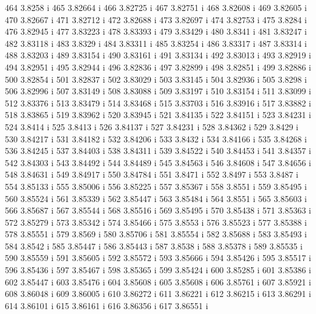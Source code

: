  464  3.8258  i
 465  3.82664  i
 466  3.82725  i
 467  3.82751  i
 468  3.82608  i
 469  3.82605  i
 470  3.82667  i
 471  3.82712  i
 472  3.82688  i
 473  3.82697  i
 474  3.82753  i
 475  3.8284  i
 476  3.82945  i
 477  3.83223  i
 478  3.83393  i
 479  3.83429  i
 480  3.8341  i
 481  3.83247  i
 482  3.83118  i
 483  3.8329  i
 484  3.83311  i
 485  3.83254  i
 486  3.83317  i
 487  3.83314  i
 488  3.83203  i
 489  3.83154  i
 490  3.83161  i
 491  3.83134  i
 492  3.83013  i
 493  3.82919  i
 494  3.82951  i
 495  3.82944  i
 496  3.82836  i
 497  3.82899  i
 498  3.82851  i
 499  3.82886  i
 500  3.82854  i
 501  3.82837  i
 502  3.83029  i
 503  3.83145  i
 504  3.82936  i
 505  3.8298  i
 506  3.82996  i
 507  3.83149  i
 508  3.83088  i
 509  3.83197  i
 510  3.83154  i
 511  3.83099  i
 512  3.83376  i
 513  3.83479  i
 514  3.83468  i
 515  3.83703  i
 516  3.83916  i
 517  3.83882  i
 518  3.83865  i
 519  3.83962  i
 520  3.83945  i
 521  3.84135  i
 522  3.84151  i
 523  3.84231  i
 524  3.8414  i
 525  3.8413  i
 526  3.84137  i
 527  3.84231  i
 528  3.84362  i
 529  3.8429  i
 530  3.84217  i
 531  3.84182  i
 532  3.84206  i
 533  3.8432  i
 534  3.84166  i
 535  3.84268  i
 536  3.84245  i
 537  3.84403  i
 538  3.84311  i
 539  3.84522  i
 540  3.84453  i
 541  3.84357  i
 542  3.84303  i
 543  3.84492  i
 544  3.84489  i
 545  3.84563  i
 546  3.84608  i
 547  3.84656  i
 548  3.84631  i
 549  3.84917  i
 550  3.84784  i
 551  3.8471  i
 552  3.8497  i
 553  3.8487  i
 554  3.85133  i
 555  3.85006  i
 556  3.85225  i
 557  3.85367  i
 558  3.8551  i
 559  3.85495  i
 560  3.85524  i
 561  3.85339  i
 562  3.85447  i
 563  3.85484  i
 564  3.8551  i
 565  3.85603  i
 566  3.85687  i
 567  3.85544  i
 568  3.85516  i
 569  3.85495  i
 570  3.85438  i
 571  3.85363  i
 572  3.85279  i
 573  3.85342  i
 574  3.85466  i
 575  3.8553  i
 576  3.85523  i
 577  3.85388  i
 578  3.85551  i
 579  3.8569  i
 580  3.85706  i
 581  3.85554  i
 582  3.85688  i
 583  3.85493  i
 584  3.8542  i
 585  3.85447  i
 586  3.85443  i
 587  3.8538  i
 588  3.85378  i
 589  3.85535  i
 590  3.85559  i
 591  3.85605  i
 592  3.85572  i
 593  3.85666  i
 594  3.85426  i
 595  3.85517  i
 596  3.85436  i
 597  3.85467  i
 598  3.85365  i
 599  3.85424  i
 600  3.85285  i
 601  3.85386  i
 602  3.85447  i
 603  3.85476  i
 604  3.85608  i
 605  3.85608  i
 606  3.85761  i
 607  3.85921  i
 608  3.86048  i
 609  3.86005  i
 610  3.86272  i
 611  3.86221  i
 612  3.86215  i
 613  3.86291  i
 614  3.86101  i
 615  3.86161  i
 616  3.86356  i
 617  3.86551  i
